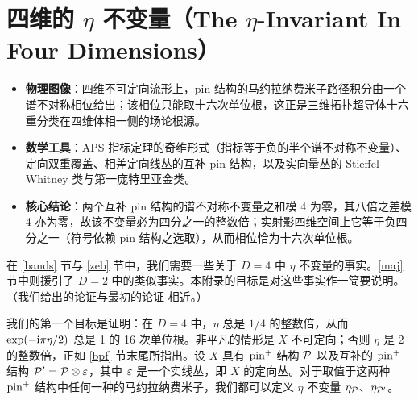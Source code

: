 
\section{四维的 $\eta$ 不变量（The \ensuremath{\eta}-Invariant In Four Dimensions）}\label{feta}

\begin{keytakeaways}
\begin{itemize}[leftmargin=1.6em,itemsep=0.2em,topsep=0.2em]
  \item \textbf{物理图像}：四维不可定向流形上，pin 结构的马约拉纳费米子路径积分由一个谱不对称相位给出；该相位只能取十六次单位根，这正是三维拓扑超导体十六重分类在四维体相一侧的场论根源。
  \item \textbf{数学工具}：APS 指标定理的奇维形式（指标等于负的半个谱不对称不变量）、定向双重覆盖、相差定向线丛的互补 pin 结构，以及实向量丛的 Stieffel--Whitney 类与第一庞特里亚金类。
  \item \textbf{核心结论}：两个互补 pin 结构的谱不对称不变量之和模 4 为零，其八倍之差模 4 亦为零，故该不变量必为四分之一的整数倍；实射影四维空间上它等于负四分之一（符号依赖 pin 结构之选取），从而相位恰为十六次单位根。
\end{itemize}
\end{keytakeaways}

在 \ref{bands} 节与 \ref{zeb} 节中，我们需要一些关于 $D=4$ 中 $\eta$ 不变量的事实。\ref{maj} 节中则援引了 $D=2$ 中的类似事实。本附录的目标是对这些事实作一简要说明。（我们给出的论证与最初的论证 \cite{G} 相近。）

我们的第一个目标是证明：在 $D=4$ 中，$\eta$ 总是 $1/4$ 的整数倍，从而 $\exp(-\i\pi \eta/2)$ 总是 1 的 16 次单位根。非平凡的情形是 $X$ 不可定向；否则 $\eta$ 是 2 的整数倍，正如 \ref{bpf} 节末尾所指出。设 $X$ 具有 $\pin^+$ 结构 $\P$ 以及互补的 $\pin^+$ 结构 $\P'=\P\otimes \veps$，其中 $\veps $ 是一个实线丛，即 $X$ 的定向丛。对于取值于这两种 $\pin^+$ 结构中任何一种的马约拉纳费米子，我们都可以定义 $\eta$ 不变量 $\eta_\P$、$\eta_{\P'}$。

